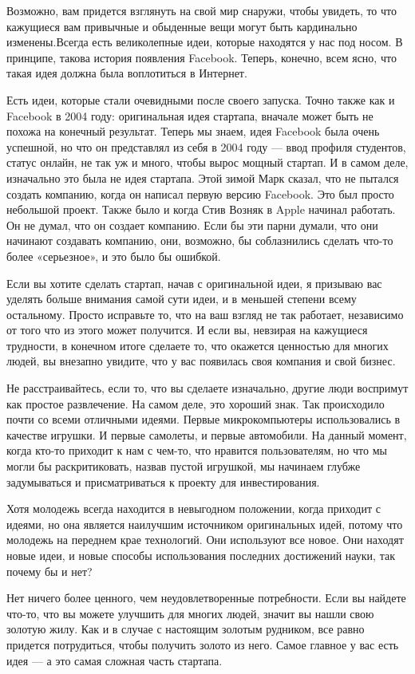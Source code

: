 \documentclass[ebook,12pt,oneside,openany]{memoir}
\begin{document}
Возможно, вам придется взглянуть на свой мир снаружи, чтобы увидеть,
то что кажущиеся вам привычные и обыденные вещи могут быть кардинально
изменены.Всегда есть великолепные идеи, которые находятся у нас под
носом. В принципе, такова история появления Facebook. Теперь, конечно,
всем ясно, что такая идея должна была воплотиться в Интернет.

Есть идеи, которые стали очевидными после своего запуска. Точно также
как и Facebook в 2004 году: оригинальная идея стартапа, вначале может
быть не похожа на конечный результат. Теперь мы знаем, идея Facebook
была очень успешной, но что он представлял из себя в 2004 году — ввод
профиля студентов, статус онлайн, не так уж и много, чтобы вырос
мощный стартап. И в самом деле, изначально это была не идея стартапа.
Этой зимой Марк сказал, что не пытался создать компанию, когда он
написал первую версию Facebook. Это был просто небольшой проект. Также
было и когда Стив Возняк в Apple начинал работать. Он не думал, что он
создает компанию. Если бы эти парни думали, что они начинают создавать
компанию, они, возможно, бы соблазнились сделать что-то более
«серьезное», и это было бы ошибкой.

Если вы хотите сделать стартап, начав с оригинальной идеи, я призываю
вас уделять больше внимания самой сути идеи, и в меньшей степени всему
остальному. Просто исправьте то, что на ваш взгляд не так работает,
независимо от того что из этого может получится. И если вы, невзирая
на кажущиеся трудности, в конечном итоге сделаете то, что окажется
ценностью для многих людей, вы внезапно увидите, что у вас появилась
своя компания и свой бизнес.

Не расстраивайтесь, если то, что вы сделаете изначально, другие люди
воспримут как простое развлечение. На самом деле, это хороший знак.
Так происходило почти со всеми отличными идеями. Первые
микрокомпьютеры использовались в качестве игрушки. И первые самолеты,
и первые автомобили. На данный момент, когда кто-то приходит к нам с
чем-то, что нравится пользователям, но что мы могли бы раскритиковать,
назвав пустой игрушкой, мы начинаем глубже задумываться и
присматриваться к проекту для инвестирования.

Хотя молодежь всегда находится в невыгодном положении, когда приходит
с идеями, но она является наилучшим источником оригинальных идей,
потому что молодежь на переднем крае технологий. Они используют все
новое. Они находят новые идеи, и новые способы использования последних
достижений науки, так почему бы и нет?

Нет ничего более ценного, чем неудовлетворенные потребности. Если вы
найдете что-то, что вы можете улучшить для многих людей, значит вы
нашли свою золотую жилу. Как и в случае с настоящим золотым рудником,
все равно придется потрудиться, чтобы получить золото из него. Самое
главное у вас есть идея — а это самая сложная часть стартапа.
\end{document}
